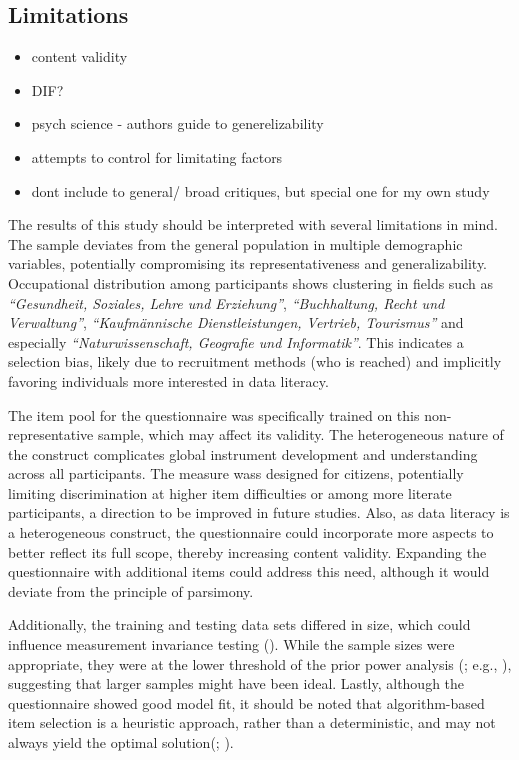 \documentclass[
  12pt,
  a4paper,
  twoside]{article}
\providecommand{\tightlist}{%
  \setlength{\itemsep}{0pt}\setlength{\parskip}{0pt}}
\begin{document}
\subsection{Limitations}\label{limitations}

\begin{itemize}
\tightlist
\item
  content validity
\item
  DIF?
\item
  psych science - authors guide to generelizability
\item
  attempts to control for limitating factors
\item
  dont include to general/ broad critiques, but special one for my own study
\end{itemize}

The results of this study should be interpreted with several limitations in mind. The sample deviates from the general population in multiple demographic variables, potentially compromising its representativeness and generalizability. Occupational distribution among participants shows clustering in fields such as \emph{``Gesundheit, Soziales, Lehre und Erziehung''}, \emph{``Buchhaltung, Recht und Verwaltung''}, \emph{``Kaufmännische Dienstleistungen, Vertrieb, Tourismus''} and especially \emph{``Naturwissenschaft, Geografie und Informatik''}. This indicates a selection bias, likely due to recruitment methods (who is reached) and implicitly favoring individuals more interested in data literacy.

The item pool for the questionnaire was specifically trained on this non-representative sample, which may affect its validity. The heterogeneous nature of the construct complicates global instrument development and understanding across all participants. The measure wass designed for citizens, potentially limiting discrimination at higher item difficulties or among more literate participants, a direction to be improved in future studies. Also, as data literacy is a heterogeneous construct, the questionnaire could incorporate more aspects to better reflect its full scope, thereby increasing content validity. Expanding the questionnaire with additional items could address this need, although it would deviate from the principle of parsimony.

Additionally, the training and testing data sets differed in size, which could influence measurement invariance testing (). While the sample sizes were appropriate, they were at the lower threshold of the prior power analysis (; e.g., ), suggesting that larger samples might have been ideal. Lastly, although the questionnaire showed good model fit, it should be noted that algorithm-based item selection is a heuristic approach, rather than a deterministic, and may not always yield the optimal solution(; ).
\end{document}
